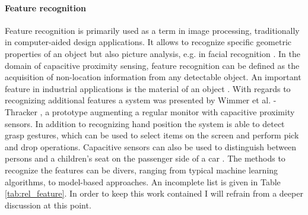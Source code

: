 \paragraph{Feature recognition}
Feature recognition is primarily used as a term in image processing, traditionally in computer-aided design applications. It allows to recognize specific geometric properties of an object but also picture analysis, e.g. in facial recognition \cite{han2000manufacturing,belhumeur1997eigenfaces}. 
In the domain of capacitive proximity sensing, feature recognition can be defined as the acquisition of non-location information from any detectable object. An important feature in industrial applications is the material of an object \cite{Baxter1996}. With regards to recognizing additional features a system was presented by Wimmer et al. - Thracker \cite{Wimmer2006}, a prototype augmenting a regular monitor with capacitive proximity sensors. In addition to recognizing hand position the system is able to detect grasp gestures, which can be used to select items on the screen and perform pick and drop operations. Capacitive sensors can also be used to distinguish between persons and a children's seat on the passenger side of a car \cite{george2009seat}. 
The methods to recognize the features can be divers, ranging from typical machine learning algorithms, to model-based approaches. An incomplete list is given in Table \ref{tab:rel_feature}. In order to keep this work contained I will refrain from a deeper discussion at this point.


